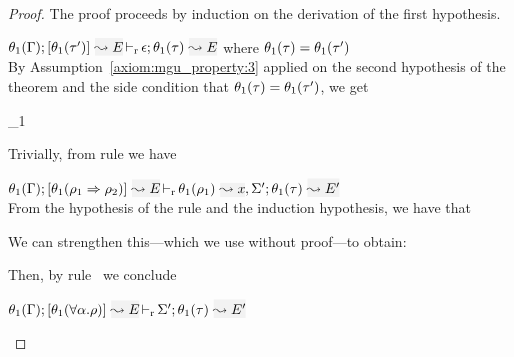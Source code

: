 \begin{proof}
The proof proceeds by induction on the derivation of the first hypothesis.
\begin{description}
\setlength{\itemsep}{1em}
\item[\fbox{\rref{M-Simp}}]\quad
$\dmres{\theta_1(\tenv)}{\theta_1(\type')}{E}{\theta_1(\type)}{E}{\epsilon}$ \quad where $\theta_1(\tau) = \theta_1(\tau')$ \\

By Assumption~\ref{axiom:mgu_property:3} applied on the second hypothesis of the theorem
and the side condition that $\theta_1(\tau) = \theta_1(\tau')$, we get
\begin{myequation*}
  \theta_1\sqsubseteq{}
\end{myequation*}
Trivially, from rule  we have
\begin{myequation*}
\end{myequation*}

\item[\fbox{\rref{M-IApp}}]\quad
$\dmres{\theta_1(\tenv)}{\theta_1(\rulet_1\To\rulet_2)}{E}{\theta_1(\type)}{E'}{\ie{\theta_1(\rulet_1)}{x},\Sigma'}$\ \\

  From the hypothesis of the rule and the induction hypothesis, we have that
\begin{myequation*}
\end{myequation*}
We can strengthen this---which we use without proof---to obtain:
\begin{myequation*}
\end{myequation*}
Then, by rule~ we conclude
\begin{myequation*}
\end{myequation*}

\item[\fbox{\rref{M-TApp}}]\quad
$\dmres{\theta_1(\tenv)}{\theta_1(\tall{\alpha}{\rulet})}{E}{\theta_1(\type)}{E'}{\Sigma'}$\ \\


\end{description}
\end{proof}
